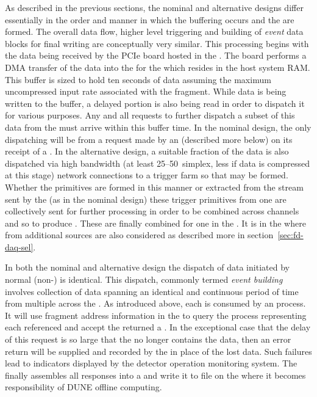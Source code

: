 As described in the previous sections, the nominal and alternative
designs differ essentially in the order and manner in which the
 buffering occurs and the  are
formed. 
The overall data flow, higher level triggering and building of
\textit{event} data blocks for final writing are conceptually very similar.
This processing begins with the data being received by the
 PCIe board hosted in the . 
The  board performs a DMA transfer of the data into the
 for the  which resides in the
 host system RAM.  
This buffer is sized to hold ten seconds of data assuming the maximum 
uncompressed input rate associated with the fragment.
While data is being written to the buffer, a delayed portion is
also being read in order to dispatch it for various purposes.
Any and all requests to further dispatch a subset of this data from
the  must arrive within this buffer time.
In the nominal design, the only dispatching will be from a request
made by an  (described more below) on its receipt of a
. 
In the alternative design, a suitable fraction of the data is also
dispatched via high bandwidth (at least \numrange{25}{50}\,\si{\Gbps} simplex, less
if data is compressed at this stage) network connections to a trigger
farm so that  may be formed. 
Whether the primitives are formed in this manner or extracted from the
stream sent by the  (as in the nominal design) these
trigger primitives from one  are collectively sent for
further processing in order to be combined across channels and so to
produce . 
These are finally combined for one  in the
. 
It is in the  where  from additional
sources are also considered as described more in
section~\ref{sec:fd-daq-sel}.

In both the nominal and alternative design the dispatch of data
initiated by normal (non-)  is
identical. 
This dispatch, commonly termed \textit{event building} involves collection
of data spanning an identical and continuous period of time from
multiple  across the .
As introduced above, each  is consumed by an
 process. 
It will use fragment address information in the  to
query the  process representing each referenced
 and accept the returned a .
In the exceptional case that the delay of this request is so large
that the  no longer contains the data, then an error
return will be supplied and recorded by the  in place of the
lost data. 
Such failures lead to indicators displayed by the detector operation
monitoring system.
The  finally assembles all responses into a
 and write it to file on the  where
it becomes responsibility of DUNE offline computing.

